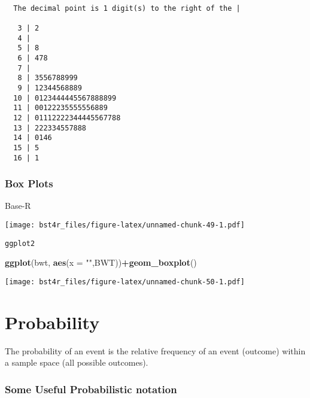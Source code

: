 \documentclass[12pt,]{article}
\newenvironment{Shaded}{\begin{snugshade}}{\end{snugshade}}
\newcommand{\DataTypeTok}[1]{\textcolor[rgb]{0.13,0.29,0.53}{#1}}
\newcommand{\KeywordTok}[1]{\textcolor[rgb]{0.13,0.29,0.53}{\textbf{#1}}}
\newcommand{\NormalTok}[1]{#1}
\newcommand{\OperatorTok}[1]{\textcolor[rgb]{0.81,0.36,0.00}{\textbf{#1}}}
\newcommand{\StringTok}[1]{\textcolor[rgb]{0.31,0.60,0.02}{#1}}
\begin{document}
\begin{verbatim}

  The decimal point is 1 digit(s) to the right of the |

   3 | 2
   4 | 
   5 | 8
   6 | 478
   7 | 
   8 | 3556788999
   9 | 12344568889
  10 | 0123444445567888899
  11 | 00122235555556889
  12 | 01112222344445567788
  13 | 222334557888
  14 | 0146
  15 | 5
  16 | 1
\end{verbatim}

\hypertarget{box-plots}{%
\subsubsection{Box Plots}\label{box-plots}}

Base-R

\begin{Shaded}
\end{Shaded}

\texttt{[image: bst4r\_files/figure-latex/unnamed-chunk-49-1.pdf]}

\texttt{ggplot2}

\begin{Shaded}
\begin{Highlighting}[]
\KeywordTok{ggplot}\NormalTok{(bwt, }\KeywordTok{aes}\NormalTok{(}\DataTypeTok{x =} \StringTok{""}\NormalTok{,BWT))}\OperatorTok{+}\KeywordTok{geom_boxplot}\NormalTok{()}
\end{Highlighting}
\end{Shaded}

\texttt{[image: bst4r\_files/figure-latex/unnamed-chunk-50-1.pdf]}

\hypertarget{probability}{%
\section{Probability}\label{probability}}

The probability of an event is the relative frequency of an event
(outcome) within a sample space (all possible outcomes).

\hypertarget{some-useful-probabilistic-notation}{%
\subsubsection{Some Useful Probabilistic
notation}\label{some-useful-probabilistic-notation}}
\end{document}
